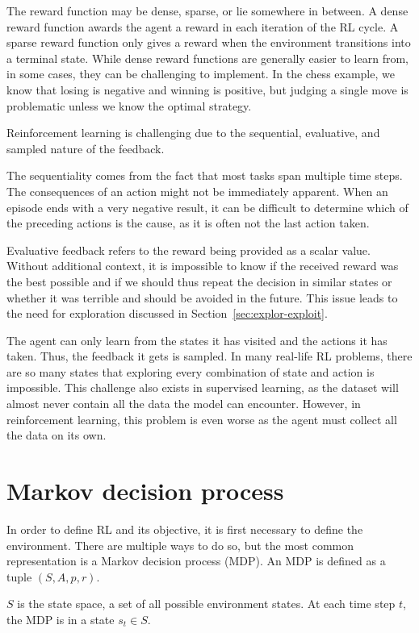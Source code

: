 \documentclass[
  digital,     %
  oneside,     %
  nosansbold,  %
  nocolorbold, %
  lof,         %
  lot,         %
]{fithesis4}
\begin{document}
The reward function may be dense, sparse, or lie somewhere in between. A dense reward function awards the agent a reward in each iteration of the RL cycle. A sparse reward function only gives a reward when the environment transitions into a terminal state. While dense reward functions are generally easier to learn from, in some cases, they can be challenging to implement. In the chess example, we know that losing is negative and winning is positive, but judging a single move is problematic unless we know the optimal strategy.

Reinforcement learning is challenging due to the sequential, evaluative, and sampled nature of the feedback.

The sequentiality comes from the fact that most tasks span multiple time steps. The consequences of an action might not be immediately apparent. When an episode ends with a very negative result, it can be difficult to determine which of the preceding actions is the cause, as it is often not the last action taken.

Evaluative feedback refers to the reward being provided as a scalar value. Without additional context, it is impossible to know if the received reward was the best possible and if we should thus repeat the decision in similar states or whether it was terrible and should be avoided in the future. This issue leads to the need for exploration discussed in Section~\ref{sec:explor-exploit}.

The agent can only learn from the states it has visited and the actions it has taken. Thus, the feedback it gets is sampled. In many real-life RL problems, there are so many states that exploring every combination of state and action is impossible. This challenge also exists in supervised learning, as the dataset will almost never contain all the data the model can encounter. However, in reinforcement learning, this problem is even worse as the agent must collect all the data on its own.

\section{Markov decision process}
In order to define RL and its objective, it is first necessary to define the environment. There are multiple ways to do so, but the most common representation is a Markov decision process (MDP). An MDP is defined as a tuple $(S, A, p, r)$.

$S$ is the state space, a set of all possible environment states. At each time step $t$, the MDP is in a state $s_t\in S$.
\end{document}
